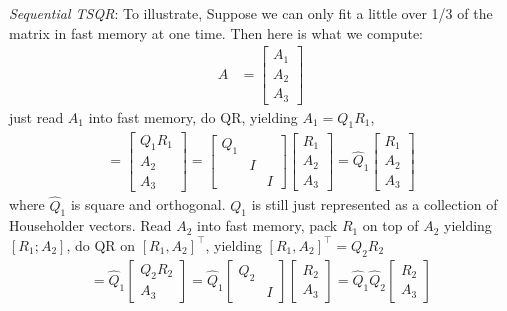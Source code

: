 \documentclass[11pt]{article}
\numberwithin{equation}{section}
\begin{document}
\textit{Sequential TSQR}: To illustrate, Suppose we can only fit a little over 1/3 of the matrix in fast memory at one time. 
Then here is what we compute: \begin{align*}
    A &= \left[\begin{array}{l}
        A_{1} \\
        A_{2} \\
        A_{3}
        \end{array}\right]             
\end{align*}
just read $A_1$ into fast memory, do QR, yielding $A_1=Q_{1} R_{1}$,
\begin{align*}
    =\left[\begin{array}{c}
        Q_{1} R_{1} \\
        A_{2} \\
        A_{3}
        \end{array}\right]=\left[\begin{array}{ccc}
        Q_{1} & & \\
        & I & \\
        & & I
        \end{array}\right]\left[\begin{array}{l}
        R_{1} \\
        A_{2} \\
        A_{3}
        \end{array}\right]=\hat{Q}_{1}\left[\begin{array}{l}
            R_{1} \\
            A_{2} \\
            A_{3}
            \end{array}\right]
\end{align*}
where $\hat{Q}_{1}$ is square and orthogonal. $Q_1$ is still just represented as a collection of Householder vectors. 
Read $A_2$ into fast memory, pack $R_1$ on top of $A_2$ yielding $[R_1;A_2]$, do QR on $[R_1,A_2]^\top $, yielding $[R_1,A_2]^\top =Q_{2} R_{2}$ \begin{align*}
    =\hat{Q}_{1}\left[\begin{array}{c}
        Q_{2} R_{2} \\
        A_{3}
        \end{array}\right]=\hat{Q}_{1}\left[\begin{array}{cc}
        Q_{2} & \\
        & I
        \end{array}\right]\left[\begin{array}{l}
        R_{2} \\
        A_{3}
        \end{array}\right]=\hat{Q}_1 \hat{Q}_{2}\left[\begin{array}{l}
        R_{2} \\
        A_{3}
        \end{array}\right]
\end{align*}
\end{document}
